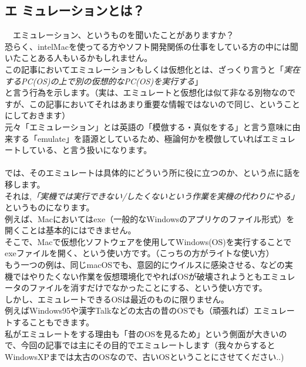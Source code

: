 \documentclass[b5paper,10pt]{jsarticle}
\begin{document}
\begin{multicols*}{3}
\section{エ
ミュレーションとは？}
　エミュレーション、というものを聞いたことがありますか？\\
恐らく、intelMacを使ってる方やソフト開発関係の仕事をしている方の中には聞いたことある人もいるかもしれません。\\
この記事においてエミュレーションもしくは仮想化とは、ざっくり言うと「\emph{実在するPC(OS)の上で別の仮想的なPC(OS)を実行する}」\\
と言う行為を示します。（実は、エミュレートと仮想化は似て非なる別物なのですが、この記事においてそれはあまり重要な情報ではないので同じ、ということにしておきます）\\
元々「エミュレーション」とは英語の「模倣する・真似をする」と言う意味に由来する「emulate」を語源としているため、極論何かを模倣していればエミュレートしている、と言う扱いになります。\\
\\
では、そのエミュレートは具体的にどういう所に役に立つのか、という点に話を移します。\\
それは,\emph{「実機では実行できない/したくないという作業を実機の代わりにやる」}というものになります。\\
例えば、Macにおいてはexe（一般的なWindowsのアプリケのファイル形式）を開くことは基本的にはできません。\\
そこで、Macで仮想化ソフトウェアを使用してWindows(OS)を実行することでexeファイルを開く、という使い方です。（こっちの方がライトな使い方）\\
もう一つの例は、同じmacOSでも、意図的にウイルスに感染させる、などの実機ではやりたくない作業を仮想環境化でやればOSが破壊されようともエミュレータのファイルを消すだけでなかったことにする、という使い方です。\\
しかし、エミュレートできるOSは最近のものに限りません。\\
例えばWindows95や漢字Talkなどの太古の昔のOSでも（頑張れば）エミュレートすることもできます。\\
私がエミュレートをする理由も「昔のOSを見るため」という側面が大きいので、今回の記事では主にその目的でエミュレートします（我々からするとWindowsXPまでは太古のOSなので、古いOSということにさせてください..)\\

\end{multicols*}
\end{document}
